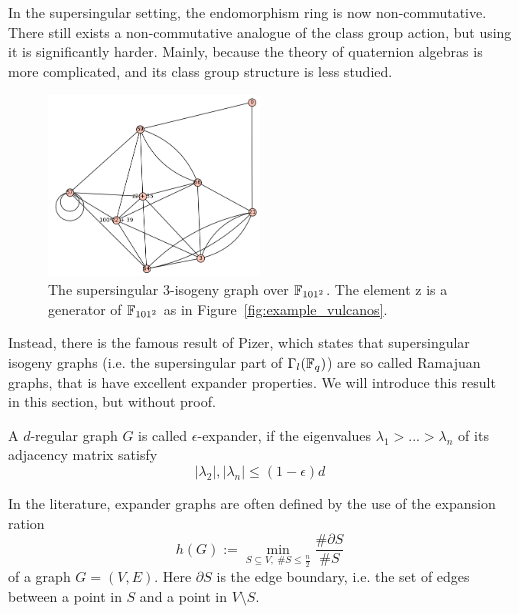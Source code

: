 In the supersingular setting, the endomorphism ring is now non-commutative.
There still exists a non-commutative analogue of the class group action, but using it is significantly harder.
Mainly, because the theory of quaternion algebras is more complicated, and its class group structure is less studied.
\begin{figure}
    \begin{center}
        \includegraphics[width = 0.5\textwidth]{../example_supersingular.png}
    \end{center}
    \caption{
        \label{fig:example_supersingular_graph} The supersingular 3-isogeny graph over $\mathbb{F}_{101^2}$.
        The element $\mathrm{z}$ is a generator of $\mathbb{F}_{101^2}$ as in Figure~\ref{fig:example_vulcanos}.
    }
\end{figure}
Instead, there is the famous result of Pizer, which states that supersingular isogeny graphs (i.e. the supersingular part of $\Gamma_l(\mathbb{F}_q)$) are so called Ramajuan graphs, that is have excellent expander properties.
We will introduce this result in this section, but without proof.
\begin{definition}
    \label{def:expander}
    A $d$-regular graph $G$ is called $\epsilon$-expander, if the eigenvalues $\lambda_1 > ... > \lambda_n$ of its adjacency matrix satisfy
    \begin{equation*}
        |\lambda_2|, |\lambda_n| \leq (1 - \epsilon) d
    \end{equation*}
\end{definition}
In the literature, expander graphs are often defined by the use of the expansion ration
\begin{equation*}
    h(G) := \min_{S \subseteq V, \ \#S \leq \frac n 2} \frac {\#\partial S} {\# S}
\end{equation*}
of a graph $G = (V, E)$.
Here $\partial S$ is the edge boundary, i.e. the set of edges between a point in $S$ and a point in $V \setminus S$.

